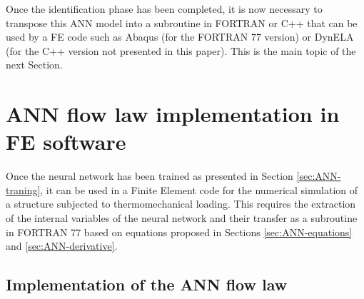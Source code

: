 \documentclass[algorithms,article,submit,pdftex,moreauthors]{Definitions/mdpi}
\begin{document}
Once the identification phase has been completed, it is now necessary to transpose this ANN model into a subroutine in FORTRAN or C++ that can be used by a FE code such as Abaqus (for the FORTRAN 77 version) or DynELA (for the C++ version not presented in this paper).
This is the main topic of the next Section.

\section{ANN flow law implementation in FE software}\label{sec:Use}

Once the neural network has been trained as presented in Section \ref{sec:ANN-traning}, it can be used in a Finite Element code for the numerical simulation of a structure subjected to thermomechanical loading.
This requires the extraction of the internal variables of the neural network and their transfer as a subroutine in FORTRAN 77 based on equations proposed in Sections \ref{sec:ANN-equations} and \ref{sec:ANN-derivative}.

\subsection{Implementation of the ANN flow law}\label{sec:Implementation}
\end{document}
